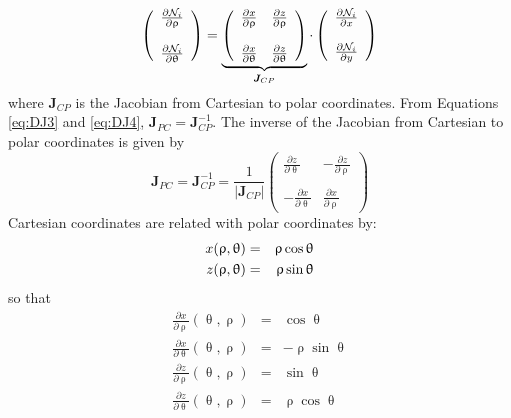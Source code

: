\begin{equation}
\left(
\begin{array}{c}
\frac{\partial {\mathcal{N}}_i}{\partial \uprho}  \\ \\
\frac{\partial {\mathcal{N}}_i}{\partial \uptheta}
\end{array}
\right)
= 
\underbrace{\left(
\begin{array}{cc}
\frac{\partial x}{\partial \uprho}   & 
\frac{\partial z}{\partial \uprho} \\ \\ 
\frac{\partial x}{\partial \uptheta}  & 
\frac{\partial z}{\partial \uptheta}  
\end{array}
\right)}_{{\bm J}_{CP}}
\cdot
\left(
\begin{array}{c}
\frac{\partial {\mathcal{N}}_i}{\partial x} \\ \\
\frac{\partial {\mathcal{N}}_i}{\partial y} 
\end{array}
\right)
\label{eq:DJ4}
\end{equation}
where ${\bm J}_{CP}$ is the Jacobian from Cartesian to polar coordinates. 
From Equations \eqref{eq:DJ3} and \eqref{eq:DJ4}, ${\bm J}_{PC}={\bm J}_{CP}^{-1} $. The inverse
of the Jacobian from Cartesian to polar coordinates is given by
\[
{\bm J}_{PC}= {\bm J}_{CP}^{-1}=
\frac{1}{|{\bm J}_{CP}|}
\left(
\begin{array}{cc}
\frac{\partial z}{\partial \uptheta}  &  -\frac{\partial z}{\partial \uprho}  \\ \\
-\frac{\partial x}{\partial \uptheta} &  \frac{\partial x}{\partial \uprho}   
\end{array}
\right)
\]
Cartesian coordinates are related with polar coordinates by:
\begin{eqnarray}
x(\uprho,\uptheta) &=& \uprho \cos \uptheta \nonumber\\
z(\uprho,\uptheta) &=& \uprho \sin \uptheta \nonumber
\end{eqnarray}
so that 
\begin{eqnarray}
\frac{\partial x}{\partial \uprho} (\uptheta,\uprho) &=&  \cos \uptheta \\
\frac{\partial x}{\partial \uptheta} (\uptheta,\uprho) &=& -\uprho \sin \uptheta \\
\frac{\partial z}{\partial \uprho} (\uptheta,\uprho) &=& \sin \uptheta \\ 
\frac{\partial z}{\partial \uptheta} (\uptheta,\uprho) &=& \uprho \cos \uptheta 
\end{eqnarray}
